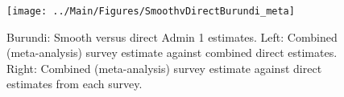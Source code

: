 \documentclass[12pt]{article}\usepackage[]{graphicx}\usepackage[]{color}
\newenvironment{knitrout}{}{} %
\begin{document}

\begin{knitrout}
\color{fgcolor}\begin{figure}[bht]

{\centering \texttt{[image: ../Main/Figures/SmoothvDirectBurundi\_meta]} 

}

\caption[Burundi]{Burundi: Smooth versus direct Admin 1 estimates. Left: Combined (meta-analysis) survey estimate against combined direct estimates. Right: Combined (meta-analysis) survey estimate against direct estimates from each survey.}\label{fig:unnamed-chunk-33}
\end{figure}


\end{knitrout}
\end{document}
